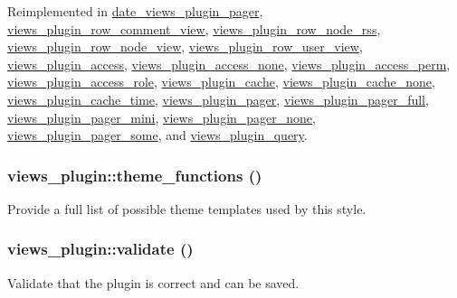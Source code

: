 Reimplemented in \hyperlink{classdate__views__plugin__pager_a8439f3b4b7c5bf990aff04627d3b38fa}{date\_\-views\_\-plugin\_\-pager}, \hyperlink{classviews__plugin__row__comment__view_a8f87e8baac2cbe47fa187c739decc88f}{views\_\-plugin\_\-row\_\-comment\_\-view}, \hyperlink{classviews__plugin__row__node__rss_a02990378bdbc80b7b20ec6d520ca34e9}{views\_\-plugin\_\-row\_\-node\_\-rss}, \hyperlink{classviews__plugin__row__node__view_a64b0c17198744b817ca0246e0d973aad}{views\_\-plugin\_\-row\_\-node\_\-view}, \hyperlink{classviews__plugin__row__user__view_acc71621b782e383515aea48f1f0d8d9a}{views\_\-plugin\_\-row\_\-user\_\-view}, \hyperlink{classviews__plugin__access_ade500a95e599deffa417f8cbdd67bbf4}{views\_\-plugin\_\-access}, \hyperlink{classviews__plugin__access__none_ab76847f19e943e463cbc2ff1723bdb00}{views\_\-plugin\_\-access\_\-none}, \hyperlink{classviews__plugin__access__perm_a1e0e33b03ffddf2b98c60740222d8ca5}{views\_\-plugin\_\-access\_\-perm}, \hyperlink{classviews__plugin__access__role_a25dbbc0f06093f0e4ee13182ea0d277f}{views\_\-plugin\_\-access\_\-role}, \hyperlink{classviews__plugin__cache_a35e5232e39c8148476328e302787d16b}{views\_\-plugin\_\-cache}, \hyperlink{classviews__plugin__cache__none_a52838d0e7db62b5e92f837df6a4931b9}{views\_\-plugin\_\-cache\_\-none}, \hyperlink{classviews__plugin__cache__time_ac8eaac0cd0c620c7583dbbe0481ca62c}{views\_\-plugin\_\-cache\_\-time}, \hyperlink{classviews__plugin__pager_a12df2a012d53b9276a14fae94511f686}{views\_\-plugin\_\-pager}, \hyperlink{classviews__plugin__pager__full_af727d597c4029f7f11721871f7b9c839}{views\_\-plugin\_\-pager\_\-full}, \hyperlink{classviews__plugin__pager__mini_af95c2913ea9b9db423fb0761e543ea09}{views\_\-plugin\_\-pager\_\-mini}, \hyperlink{classviews__plugin__pager__none_abf1170948c1653a9b6e8d4c92273060b}{views\_\-plugin\_\-pager\_\-none}, \hyperlink{classviews__plugin__pager__some_a2effa2f5a44d1a73a0b53653658d6ed6}{views\_\-plugin\_\-pager\_\-some}, and \hyperlink{classviews__plugin__query_a501630ab900fb802d83366fd4a76b646}{views\_\-plugin\_\-query}.\hypertarget{classviews__plugin_ab20d2d49f24db9ee7f162341564fd2fd}{
\subsubsection[{theme\_\-functions}]{\setlength{\rightskip}{0pt plus 5cm}views\_\-plugin::theme\_\-functions ()}}
\label{classviews__plugin_ab20d2d49f24db9ee7f162341564fd2fd}
Provide a full list of possible theme templates used by this style. \hypertarget{classviews__plugin_aaf004b6a719837f08a1ffe4a1cf4d442}{
\subsubsection[{validate}]{\setlength{\rightskip}{0pt plus 5cm}views\_\-plugin::validate ()}}
\label{classviews__plugin_aaf004b6a719837f08a1ffe4a1cf4d442}
Validate that the plugin is correct and can be saved.

